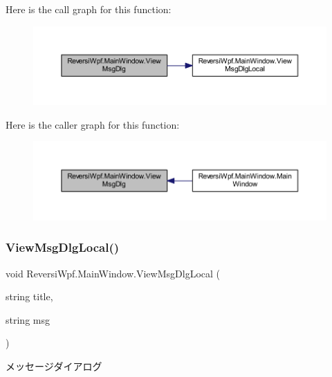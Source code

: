Here is the call graph for this function\+:
\nopagebreak
\begin{figure}[H]
\begin{center}
\leavevmode
\includegraphics[width=350pt]{class_reversi_wpf_1_1_main_window_aa776c697ed89869c9799576f2f6022b9_cgraph}
\end{center}
\end{figure}
Here is the caller graph for this function\+:
\nopagebreak
\begin{figure}[H]
\begin{center}
\leavevmode
\includegraphics[width=350pt]{class_reversi_wpf_1_1_main_window_aa776c697ed89869c9799576f2f6022b9_icgraph}
\end{center}
\end{figure}
\mbox{\label{class_reversi_wpf_1_1_main_window_a3095c98dbf6fcd1f738354a06797beb1}} 
\subsubsection{\texorpdfstring{View\+Msg\+Dlg\+Local()}{ViewMsgDlgLocal()}}
{\footnotesize\ttfamily void Reversi\+Wpf.\+Main\+Window.\+View\+Msg\+Dlg\+Local (\begin{DoxyParamCaption}\item[{string}]{title,  }\item[{string}]{msg }\end{DoxyParamCaption})}



メッセージダイアログ 


